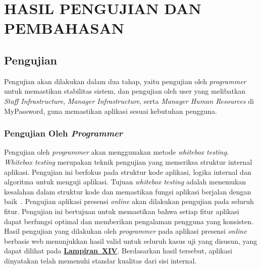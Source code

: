 \chapter{HASIL PENGUJIAN DAN PEMBAHASAN}

\section{Pengujian}
Pengujian akan dilakukan dalam dua tahap, yaitu pengujian oleh \textit{programmer} untuk memastikan stabilitas sistem, dan pengujian oleh user yang melibatkan \textit{Staff Infrastructure}, \textit{Manager Infrastructure}, serta \textit{Manager Human Resources} di MyPassword, guna memastikan aplikasi sesuai kebutuhan pengguna.

\subsection{Pengujian Oleh \textit{Programmer}}
Pengujian oleh \textit{programmer} akan menggunakan metode \textit{whitebox testing}. \textit{Whitebox testing} merupakan teknik pengujian yang memeriksa struktur internal aplikasi. Pengujian ini berfokus pada struktur kode aplikasi, logika internal dan algoritma untuk menguji aplikasi. Tujuan \textit{whitebox testing} adalah menemukan kesalahan dalam struktur kode dan memastikan fungsi aplikasi berjalan dengan baik~\cite{introducion2023panagiotis}. Pengujian aplikasi presensi \textit{online} akan dilakukan pengujian pada seluruh fitur. Pengujian ini bertujuan untuk memastikan bahwa setiap fitur aplikasi dapat berfungsi optimal dan memberikan pengalaman pengguna yang konsisten. Hasil pengujian yang dilakukan oleh \textit{programmer} pada aplikasi presensi \textit{online} berbasis web menunjukkan hasil valid untuk seluruh kasus uji yang disusun, yang dapat dilihat pada \textbf{\hyperref[sec:whitebox-testing-aplikasi-presensi-online-oleh-programmer]{Lampiran~XIV}}. Berdasarkan hasil tersebut, aplikasi dinyatakan telah memenuhi standar kualitas dari sisi internal.

